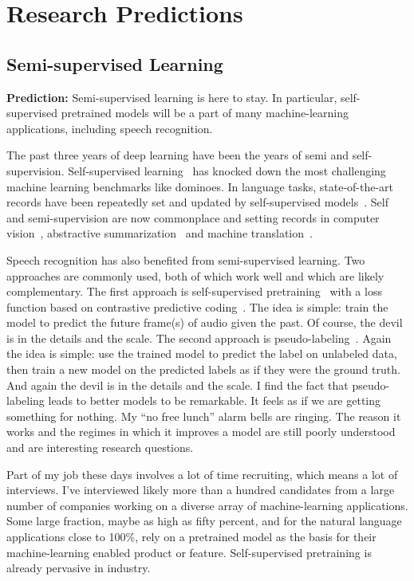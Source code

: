 \section{Research Predictions}
\label{sec:research_predictions}

\subsection{Semi-supervised Learning}

{\bf Prediction:} Semi-supervised learning is here to stay. In particular,
self-supervised pretrained models will be a part of many machine-learning
applications, including speech recognition.

The past three years of deep learning have been the years of semi and
self-supervision. Self-supervised learning~\cite{lecun2021self} has knocked
down the most challenging machine learning benchmarks like dominoes.
In language tasks, state-of-the-art records have been repeatedly set and
updated by self-supervised models~\citep{devlin2019bert, radford2019language,
yang2019xlnet}. Self and semi-supervision are now commonplace and setting
records in computer vision~\citep{he2020momentum, chen2020simple,
grill2020bootstrap}, abstractive summarization~\citep{zhang2020pegasus} and
machine translation~\citep{sennrich2016improving}.

Speech recognition has also benefited from semi-supervised learning. Two
approaches are commonly used, both of which work well and which are likely
complementary. The first approach is self-supervised
pretraining~\citep{schneider2019wav2vec, zhang2020pushing} with a loss function
based on contrastive predictive coding~\citep{oord2018representation}. The idea
is simple: train the model to predict the future frame(s) of audio given the
past. Of course, the devil is in the details and the scale. The second approach
is pseudo-labeling~\citep{lee2013pseudo, kahn2020self, xu2020iterative}. Again
the idea is simple: use the trained model to predict the label on unlabeled
data, then train a new model on the predicted labels as if they were the ground
truth. And again the devil is in the details and the scale. I find the fact
that pseudo-labeling leads to better models to be remarkable. It feels as if we
are getting something for nothing. My ``no free lunch'' alarm bells are
ringing. The reason it works and the regimes in which it improves a model are
still poorly understood and are interesting research questions.

Part of my job these days involves a lot of time recruiting, which means a lot
of interviews. I've interviewed likely more than a hundred candidates from a
large number of companies working on a diverse array of machine-learning
applications. Some large fraction, maybe as high as fifty percent, and for the
natural language applications close to 100\%, rely on a pretrained model as the
basis for their machine-learning enabled product or feature. Self-supervised
pretraining is already pervasive in industry.

